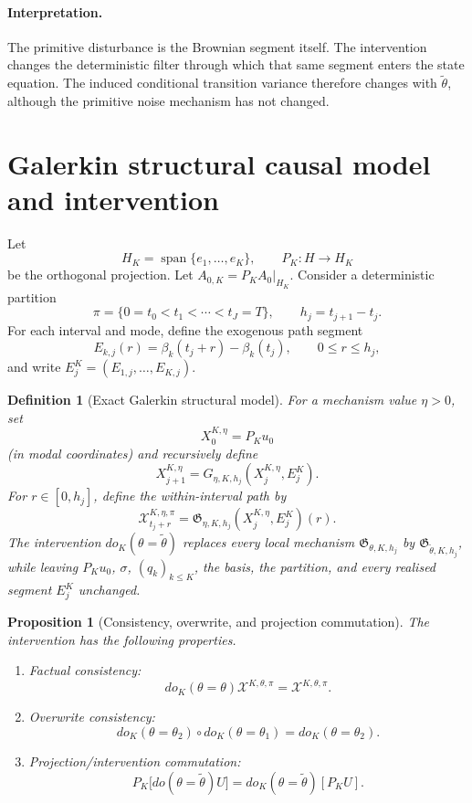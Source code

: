 \documentclass[11pt]{article}
\newtheorem{definition}[assumption]{Definition}
\newtheorem{proposition}[assumption]{Proposition}
\theoremstyle{remark}
\newcommand{\1}{\mathbf 1}
\begin{document}
\paragraph{Interpretation.}
The primitive disturbance is the Brownian segment itself.  The intervention changes the deterministic filter through which that same segment enters the state equation.  The induced conditional transition variance therefore changes with \(\widetilde\theta\), although the primitive noise mechanism has not changed.

\section{Galerkin structural causal model and intervention}

Let
\[
  H_K=\operatorname{span}\{e_1,\ldots,e_K\},
  \qquad
  P_K:H\to H_K
\]
be the orthogonal projection.  Let \(A_{0,K}=P_KA_0|_{H_K}\).  Consider a deterministic partition
\[
  \pi=\{0=t_0<t_1<\cdots<t_J=T\},
  \qquad h_j=t_{j+1}-t_j.
\]
For each interval and mode, define the exogenous path segment
\[
  E_{k,j}(r)=\beta_k(t_j+r)-\beta_k(t_j),
  \qquad 0\le r\le h_j,
\]
and write \(E_j^K=(E_{1,j},\ldots,E_{K,j})\).

\begin{definition}[Exact Galerkin structural model]\label{def:scm}
For a mechanism value \(\eta>0\), set
\[
  X_0^{K,\eta}=P_Ku_0
\]
(in modal coordinates) and recursively define
\begin{equation}\label{eq:recursion}
  X_{j+1}^{K,\eta}
  =G_{\eta,K,h_j}(X_j^{K,\eta},E_j^K).
\end{equation}
For \(r\in[0,h_j]\), define the within-interval path by
\begin{equation}\label{eq:stitch}
  \mathcal X_{t_j+r}^{K,\eta,\pi}
  =\mathfrak G_{\eta,K,h_j}(X_j^{K,\eta},E_j^K)(r).
\end{equation}
The intervention \(do_K(\theta=\widetilde\theta)\) replaces every local mechanism
\(\mathfrak G_{\theta,K,h_j}\) by \(\mathfrak G_{\widetilde\theta,K,h_j}\), while leaving \(P_Ku_0\), \(\sigma\), \((q_k)_{k\le K}\), the basis, the partition, and every realised segment \(E_j^K\) unchanged.
\end{definition}

\begin{proposition}[Consistency, overwrite, and projection commutation]\label{prop:algebra}
The intervention has the following properties.
\begin{enumerate}[label=(\roman*)]
\item Factual consistency:
\[
 do_K(\theta=\theta)\mathcal X^{K,\theta,\pi}
 =\mathcal X^{K,\theta,\pi}.
\]
\item Overwrite consistency:
\[
 do_K(\theta=\theta_2)\circ do_K(\theta=\theta_1)
 =do_K(\theta=\theta_2).
\]
\item Projection/intervention commutation:
\[
 P_K\bigl[do(\theta=\widetilde\theta)U\bigr]
 =do_K(\theta=\widetilde\theta)[P_KU].
\]
\end{enumerate}
\end{proposition}
\end{document}
